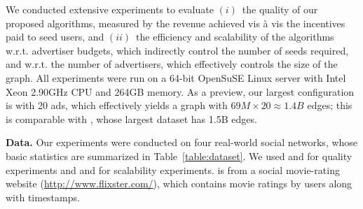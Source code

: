 We conducted extensive experiments to evaluate $(i)$\ the quality of our proposed algorithms, measured by the revenue achieved vis \`{a} vis the incentives paid to seed users,
and $(ii)$\ the efficiency and scalability of the algorithms w.r.t. advertiser  budgets, which indirectly control the number of seeds required, and w.r.t. the number of advertisers, which effectively controls the size of the graph. %
All experiments were run on a 64-bit OpenSuSE Linux server with Intel Xeon 2.90GHz CPU and 264GB memory.
As a preview, our largest configuration is \livej with 20 ads, which effectively yields a graph with $69M \times 20 \approx 1.4B$ edges; this is comparable with  \cite{tang14}, whose largest dataset has 1.5B edges.

\smallskip\noindent\textbf{Data.}
Our experiments were conducted on four real-world social networks, whose basic statistics are summarized in Table~\ref{table:dataset}.
We used \flix and \epi  for quality experiments and \dblp and \livej for scalability experiments.
\flix is from a social movie-rating website (\url{http://www.flixster.com/}),  which contains movie ratings by users along with timestamps.

